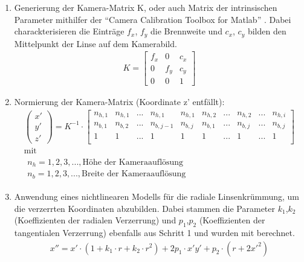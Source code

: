 \begin{enumerate}
	\item Generierung der Kamera-Matrix K, oder auch Matrix der intrinsischen Parameter mithilfer der "`Camera Calibration Toolbox for Matlab"' \citep{Calib}. Dabei charackterisieren die Einträge $f_x$, $f_y$ die Brennweite und $c_x$, $c_y$ bilden den Mittelpunkt der Linse  auf dem Kamerabild.
	\begin{align*}
	K = \begin{bmatrix}
	f_x &  0 & c_x\\ 
	0 & f_y & c_y\\ 
	0 & 0 & 1
	\end{bmatrix}
	\end{align*}  
	\item Normierung der Kamera-Matrix (Koordinate z' entfällt): 
	\setcounter{MaxMatrixCols}{20} 
	\begin{gather*}
	\begin{pmatrix} x'\\ y'\\ z' \end{pmatrix} = K^{-1} \cdot 
	\begin{bmatrix}
	n_{h,1} & n_{h,1} & ... & n_{h,1} & n_{h,1} & n_{h,2} & ... & n_{h,2} & ... & n_{h,i}\\
	n_{b,1} & n_{b,2} & ... & n_{b,j-1} & n_{b,j} & n_{b,1} & ... & n_{b,j} & ... & n_{b,j}\\
	1 & 1 & ... & 1 & 1 & 1 & ... & 1 & ... & 1\\
	\end{bmatrix} \\[1mm] \text{mit} \\[1mm]
	\begin{matrix}
	n_{h} = 1,2,3,..., \text{Höhe der Kameraauflösung}\\ 
	n_{b} = 1,2,3,..., \text{Breite der Kameraauflösung}
	\end{matrix}
	\end{gather*}
	\item Anwendung eines nichtlinearen Modells für die radiale Linsenkrümmung, um die verzerrten Koordinaten abzubilden. Dabei stammen die Parameter $k_1$,$k_2$ (Koeffizienten der radialen Verzerrung) und  $p_1$,$p_2$ (Koeffizienten der tangentialen Verzerrung) ebenfalls aus Schritt 1 und wurden mit \citep{Calib} berechnet.
	\begin{gather*}
	{x}'' = x'\cdot \left ( 1+k_1\cdot r + k_2\cdot r^2 \right )+2 p_1\cdot x'y'+p_2\cdot \left ( r+2{x}'^2 \right )\\

\end{gather*}
\end{enumerate}

